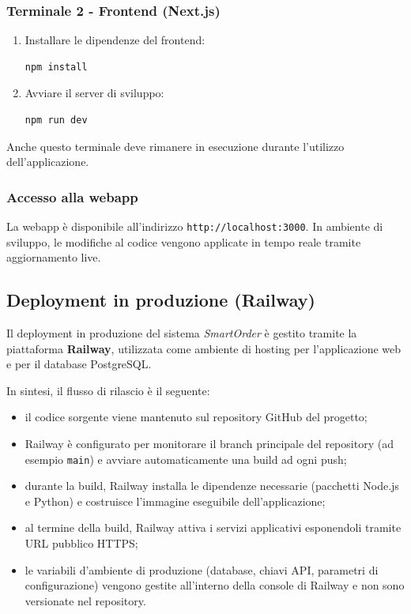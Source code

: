 \documentclass[a4paper, 11pt, oneside]{scrartcl}
\begin{document}
\subsubsection{Terminale 2 - Frontend (Next.js)}
\begin{enumerate}
    \item Installare le dipendenze del frontend:
          \begin{lstlisting}[language=bash]
npm install
\end{lstlisting}
    \item Avviare il server di sviluppo:
          \begin{lstlisting}[language=bash]
npm run dev
\end{lstlisting}
\end{enumerate}

Anche questo terminale deve rimanere in esecuzione durante l'utilizzo dell'applicazione.

\subsubsection{Accesso alla webapp}
La webapp \`e disponibile all'indirizzo \texttt{http://localhost:3000}.
In ambiente di sviluppo, le modifiche al codice vengono applicate in tempo reale tramite aggiornamento live.

\subsection{Deployment in produzione (Railway)}

Il deployment in produzione del sistema \textit{SmartOrder} \`e gestito tramite la piattaforma \textbf{Railway}, utilizzata come ambiente di hosting per l'applicazione web e per il database PostgreSQL.

In sintesi, il flusso di rilascio \`e il seguente:
\begin{itemize}
    \item il codice sorgente viene mantenuto sul repository GitHub del progetto;
    \item Railway \`e configurato per monitorare il branch principale del repository (ad esempio \texttt{main}) e avviare automaticamente una build ad ogni push;
    \item durante la build, Railway installa le dipendenze necessarie (pacchetti Node.js e Python) e costruisce l'immagine eseguibile dell'applicazione;
    \item al termine della build, Railway attiva i servizi applicativi esponendoli tramite URL pubblico HTTPS;
    \item le variabili d'ambiente di produzione (database, chiavi API, parametri di configurazione) vengono gestite all'interno della console di Railway e non sono versionate nel repository.
\end{itemize}
\end{document}
